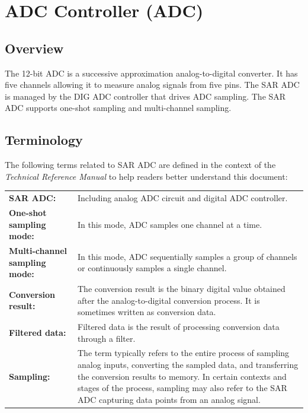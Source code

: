 \documentclass[main\_\_EN.tex]{subfiles}
\begin{document}

\ifglobal
\else
    {\let\clearpage\relax \listoftodos}
    {\let\clearpage\relax \listofdonetodos}
    \tableofcontents
\fi



\hypertarget{adc}{}
\chapter{ADC Controller (ADC)}
\label{mod:adc}

\section{Overview}

The 12-bit ADC is a successive approximation analog-to-digital converter. It has five channels allowing it to measure analog signals from five pins. The SAR ADC is managed by the DIG ADC controller that drives ADC sampling. The SAR ADC supports one-shot sampling and multi-channel sampling.

\section{Terminology}

The following terms related to SAR ADC are defined in the context of the \textit{\chipname{} Technical Reference Manual} to help readers better understand this document:

\begin{longtable}{ R{6cm} p{10cm} }
\textbf{SAR ADC:} & Including analog ADC circuit and digital ADC controller. \\
\textbf{One-shot sampling mode:} & In this mode, ADC samples one channel at a time. \\
\textbf{Multi-channel sampling mode:} & In this mode, ADC sequentially samples a group of channels or continuously samples a single channel.  \\
\textbf{Conversion result:} & The conversion result is the binary digital value obtained after the analog-to-digital conversion process. It is sometimes written as conversion data.\\
\textbf{Filtered data:} & Filtered data is the result of processing conversion data through a filter.\\
\textbf{Sampling:} & The term typically refers to the entire process of sampling analog inputs, converting the sampled data, and transferring the conversion results to memory. In certain contexts and stages of the process, sampling may also refer to the SAR ADC capturing data points from an analog signal.\\
\end{longtable}
\end{document}
